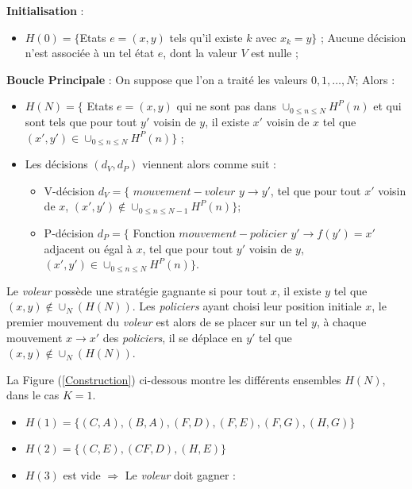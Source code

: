 {\textbf{Initialisation }:

\begin{itemize}[label=$\square$]
	\item	$H(0) = \{$Etats $e = (x, y)$ tels qu'il existe $k$ avec $x_k = y \}$ ; Aucune décision n'est associée à un tel état $e$, dont la valeur $V$ est nulle ;
\end{itemize}

\textbf{Boucle Principale} : On suppose que l'on a traité les valeurs $0, 1, \dots, N $; Alors :

\begin{itemize}[label=$\square$]
	\item	$H(N) = \{$ Etats $e = (x, y)$ qui ne sont pas dans $ \cup_{0 \leq n \leq N}  H^P(n)$ et qui sont tels que pour tout $y'$ voisin de $y$, il existe $x'$ voisin de $x$ tel que  $(x', y') \in \cup_{0 \leq n \leq N}  H^P(n)\}$ ; 
	\item	Les décisions $(d_V, d_P)$ viennent alors comme suit : 
	\begin{itemize}
		\item V-décision $d_V=\{$  $mouvement-voleur$ $y \rightarrow y'$, tel que pour tout $x'$ voisin de $x$, $(x', y') \notin \cup_{0 \leq n \leq N-1}  H^P(n)\}$;
		\item	P-décision $d_P =\{$ Fonction $mouvement-policier$  $y' \rightarrow f(y')=x'$ adjacent ou égal à $x$, tel que pour tout $y'$ voisin de $y$, $(x', y') \in \cup_{0 \leq n \leq N}  H^P(n)\}$.
	\end{itemize}
\end{itemize}

Le \textit{voleur} possède une stratégie gagnante si pour tout $x$, il existe $y$ tel que $(x, y)  \notin \cup_N (H (N))$. Les \textit{policiers} ayant choisi leur position initiale $x$, le premier mouvement du \textit{voleur} est alors de se placer sur un tel $y$, à chaque mouvement $x \rightarrow x'$ des \textit{policiers}, il se déplace en $y'$ tel que $(x, y)  \notin \cup_N (H (N))$.

La Figure (\ref{Construction}) ci-dessous montre les différents ensembles $H(N)$, dans le cas $K = 1$.
\begin{itemize}
	\item $H(1) = \{(C, A), (B, A), (F, D), (F, E), (F, G), (H, G)\}$
	\item $H(2) = \{(C, E), (CF, D), (H, E)\}$
	\item $H(3)$ est vide $\Rightarrow$ Le \textit{voleur} doit gagner :
	

\end{itemize}}
